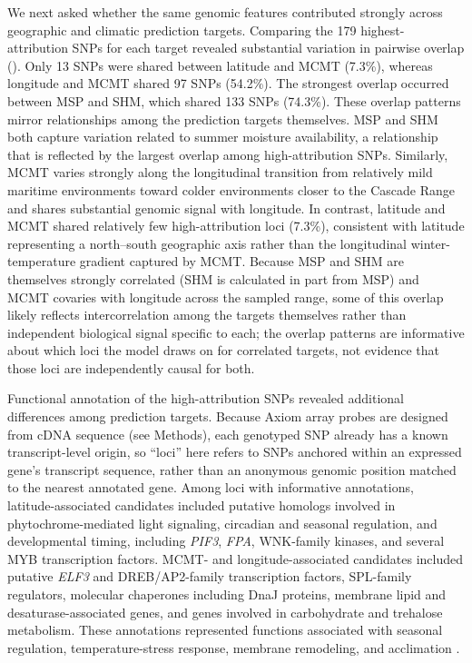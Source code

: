 \documentclass[]{article}
\begin{document}
We next asked whether the same genomic features contributed strongly across geographic 
and climatic prediction targets. Comparing the 179 highest-attribution SNPs for 
each target revealed substantial variation in pairwise overlap (). 
Only 13 SNPs were shared between latitude and MCMT (7.3\%), 
whereas longitude and MCMT shared 97 SNPs (54.2\%). 
The strongest overlap occurred between MSP and SHM, which shared 133 SNPs (74.3\%). 
These overlap patterns mirror relationships among the prediction targets themselves. 
MSP and SHM both capture variation related to summer moisture availability, a 
relationship that is reflected by the largest overlap among high-attribution SNPs. 
Similarly, MCMT varies strongly along the longitudinal transition from relatively 
mild maritime environments toward colder environments closer to the Cascade Range 
and shares substantial genomic signal with longitude. In contrast, 
latitude and MCMT shared relatively few high-attribution loci (7.3\%), 
consistent with latitude representing a north--south geographic axis rather
than the longitudinal winter-temperature gradient captured by MCMT. Because
MSP and SHM are themselves strongly correlated (SHM is calculated in part
from MSP) and MCMT covaries with longitude across the sampled range, some of
this overlap likely reflects intercorrelation among the targets themselves
rather than independent biological signal specific to each; the overlap
patterns are informative about which loci the model draws on for correlated
targets, not evidence that those loci are independently causal for both.

Functional annotation of the high-attribution SNPs revealed additional
differences among prediction targets. Because Axiom array probes are designed
from cDNA sequence (see Methods), each genotyped SNP already has a known
transcript-level origin, so ``loci'' here refers to SNPs anchored within an
expressed gene's transcript sequence, rather than an anonymous genomic
position matched to the nearest annotated gene. Among loci with informative annotations,
latitude-associated candidates included putative homologs involved in 
phytochrome-mediated light signaling, circadian and seasonal regulation, 
and developmental timing, including \textit{PIF3}, \textit{FPA}, WNK-family kinases, 
and several MYB transcription factors. MCMT- and longitude-associated candidates 
included putative \textit{ELF3} and DREB/AP2-family transcription factors, 
SPL-family regulators, molecular chaperones including DnaJ proteins, 
membrane lipid and desaturase-associated genes, and genes involved in 
carbohydrate and trehalose metabolism. These annotations represented 
functions associated with seasonal regulation, temperature-stress response, 
membrane remodeling, and acclimation \citep{lee_photoperiodic_2012, chen_acyl_2013}. 
\end{document}
